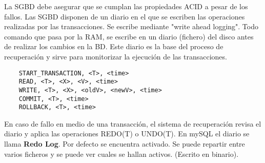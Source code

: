 \documentclass{article}
\begin{document}
La SGBD debe asegurar que se cumplan las propiedades ACID a pesar de los fallos. 
Las SGBD disponen de un diario en el que se escriben las operaciones realizadas por las transacciones. Se escribe mediante "write ahead logging". Todo comando que pasa por la RAM, se escribe en un diario (fichero) del disco antes de realizar los cambios en la BD. Este diario es la base del proceso de recuperación y sirve para monitorizar la ejecución de las transacciones. 
\begin{verbatim}
	START_TRANSACTION, <T>, <time>
	READ, <T>, <X>, <V>, <time>
	WRITE, <T>, <X>, <oldV>, <newV>, <time>
	COMMIT, <T>, <time>
	ROLLBACK, <T>, <time>
\end{verbatim}
En caso de fallo en medio de una transacción, el sistema de recuperación revisa el diario y aplica las operaciones REDO(T) o UNDO(T). 
En mySQL el diario se llama \textbf{Redo Log}. Por defecto se encuentra activado. Se puede repartir entre varios ficheros y se puede ver cuales se hallan activos. (Escrito en binario).
\end{document}
